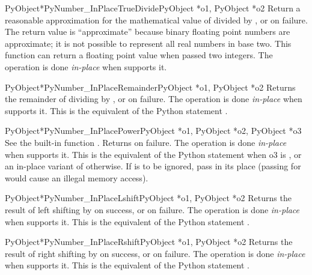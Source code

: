 \begin{cfuncdesc}{PyObject*}{PyNumber_InPlaceTrueDivide}{PyObject *o1,
                                                         PyObject *o2}
  Return a reasonable approximation for the mathematical value of
   divided by , or \NULL{} on failure.  The return
  value is ``approximate'' because binary floating point numbers are
  approximate; it is not possible to represent all real numbers in
  base two.  This function can return a floating point value when
  passed two integers.  The operation is done \emph{in-place} when
   supports it.
\end{cfuncdesc}


\begin{cfuncdesc}{PyObject*}{PyNumber_InPlaceRemainder}{PyObject *o1,
                                                        PyObject *o2}
  Returns the remainder of dividing  by , or \NULL{}
  on failure.  The operation is done \emph{in-place} when 
  supports it.  This is the equivalent of the Python statement
  .
\end{cfuncdesc}


\begin{cfuncdesc}{PyObject*}{PyNumber_InPlacePower}{PyObject *o1,
                                                    PyObject *o2, PyObject *o3}
  See the built-in function .
  Returns \NULL{} on failure.  The operation is done \emph{in-place}
  when  supports it.  This is the equivalent of the Python
  statement  when o3 is ,
  or an in-place variant of 
  otherwise. If  is to be ignored, pass  in its
  place (passing \NULL{} for  would cause an illegal memory
  access).
\end{cfuncdesc}

\begin{cfuncdesc}{PyObject*}{PyNumber_InPlaceLshift}{PyObject *o1,
                                                     PyObject *o2}
  Returns the result of left shifting  by  on success,
  or \NULL{} on failure.  The operation is done \emph{in-place} when
   supports it.  This is the equivalent of the Python
  statement .
\end{cfuncdesc}


\begin{cfuncdesc}{PyObject*}{PyNumber_InPlaceRshift}{PyObject *o1,
                                                     PyObject *o2}
  Returns the result of right shifting  by  on
  success, or \NULL{} on failure.  The operation is done
  \emph{in-place} when  supports it.  This is the equivalent
  of the Python statement .
\end{cfuncdesc}


